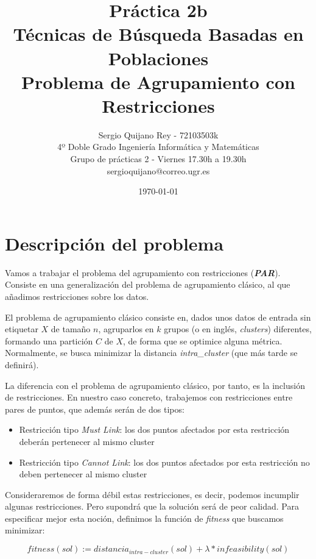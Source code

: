 \documentclass[11pt]{article}
\title{
{Práctica 2b}\\
{Técnicas de Búsqueda Basadas en Poblaciones}\\
{Problema de Agrupamiento con Restricciones}\\
}
\author{
{Sergio Quijano Rey - 72103503k}\\
{4º Doble Grado Ingeniería Informática y Matemáticas}\\
{Grupo de prácticas 2 - Viernes 17.30h a 19.30h}\\
{sergioquijano@correo.ugr.es}
}
\date{\today}
\begin{document}
\maketitle
\pagebreak

\tableofcontents

\listoffigures




\pagebreak

\section{Descripción del problema}

Vamos a trabajar el problema del agrupamiento con restricciones (\textbf{\emph{PAR}}). Consiste en una generalización del problema de agrupamiento clásico, al que añadimos restricciones sobre los datos.

El problema de agrupamiento clásico consiste en, dados unos datos de entrada sin etiquetar $X$ de tamaño $n$, agruparlos en $k$ grupos (o en inglés, \emph{clusters}) diferentes, formando una partición $C$ de $X$, de forma que se optimice alguna métrica. Normalmente, se busca minimizar la distancia \emph{intra\_cluster} (que más tarde se definirá).

La diferencia con el problema de agrupamiento clásico, por tanto, es la inclusión de restricciones. En nuestro caso concreto, trabajemos con restricciones entre pares de puntos, que además serán de dos tipos:

\begin{itemize}
\item Restricción tipo \emph{Must Link}: los dos puntos afectados por esta restricción deberán pertenecer al mismo cluster
\item Restricción tipo \emph{Cannot Link}: los dos puntos afectados por esta restricción no deben pertenecer al mismo cluster
\end{itemize}

Consideraremos de forma débil estas restricciones, es decir, podemos incumplir algunas restricciones. Pero supondrá que la solución será de peor calidad. Para especificar mejor esta noción, definimos la función de \emph{fitness} que buscamos minimizar:

\begin{displaymath}
fitness(sol) := distancia_{intra-cluster}(sol) + \lambda * infeasibility(sol)
\end{displaymath}
\end{document}
